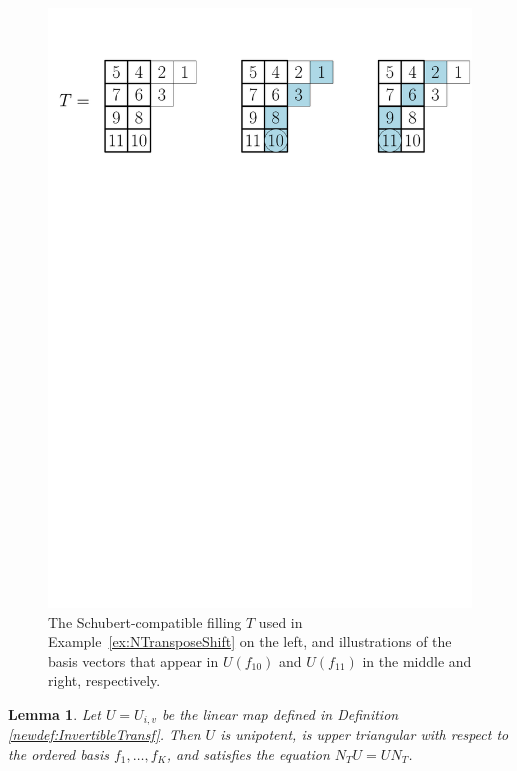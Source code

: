 \documentclass[11pt]{amsart}
\newtheorem{lemma}[theorem]{Lemma}     %
\theoremstyle{definition}
\begin{document}
\begin{figure}[t]
    \centering
    \includegraphics[scale=0.45]{Figures/NTransposeShift.pdf}
    \caption{The Schubert-compatible filling $T$ used in Example~\ref{ex:NTransposeShift} on the left, and illustrations of the basis vectors that appear in $U(f_{10})$ and $U(f_{11})$ in the middle and right, respectively.}
    \label{fig:NTransposeShift}
\end{figure}

\begin{lemma}\label{lem:InvertibleTransf}
Let $U = U_{i,v}$ be the linear map defined in Definition \ref{newdef:InvertibleTransf}. Then $U$
is unipotent, is upper triangular with respect to the ordered basis $f_1,\ldots,f_K$, and satisfies the equation $N_TU = UN_T$.
\end{lemma}
\end{document}
